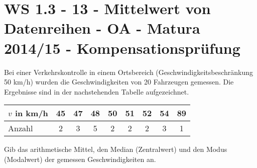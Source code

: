 \section{WS 1.3 - 13 - Mittelwert von Datenreihen - OA - Matura 2014/15 - Kompensationsprüfung}

\begin{beispiel}[WS 1.3]{1} %
				Bei einer Verkehrskontrolle in einem Ortsbereich (Geschwindigkeitsbeschränkung 50 km/h) wurden die Geschwindigkeiten von 20 Fahrzeugen gemessen. Die Ergebnisse sind in der nachstehenden Tabelle aufgezeichnet.
				\begin{center}
				\begin{tabular}{|l|c|c|c|c|c|c|c|c|}\hline
								$v$ in km/h&45&47&48&50&51&52&54&89\\ \hline
				Anzahl&2&3&5&2&2&2&3&1\\ \hline
				\end{tabular}
\end{center}

Gib das arithmetische Mittel, den Median (Zentralwert) und den Modus (Modalwert) der gemessen Geschwindigkeiten an.\\

\end{beispiel}